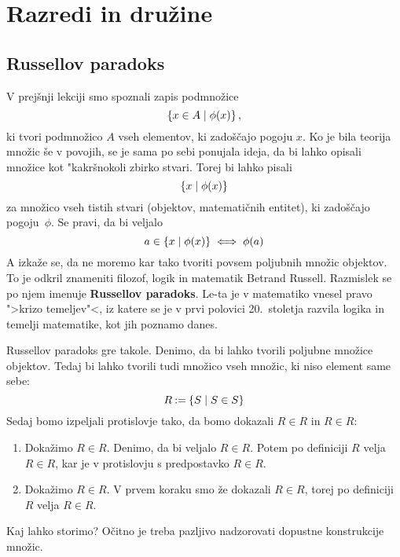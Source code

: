 \chapter{Razredi in družine}

\section{Russellov paradoks}

V prejšnji lekciji smo spoznali zapis podmnožice
%
\begin{equation*}
    \left\{ x \in A \; \middle| \; \phi(x) \right\},
\end{equation*}
%
ki tvori podmnožico $A$ vseh elementov, ki zadoščajo pogoju $x$. Ko je bila
teorija množic še v povojih, se je sama po sebi ponujala ideja, da bi lahko
opisali množice kot "kakršnokoli zbirko stvari. Torej bi lahko pisali
%
\begin{equation*}
    \left\{ x \; \middle| \; \phi(x) \right\}
\end{equation*}
%
za množico vseh tistih stvari (objektov, matematičnih entitet), ki zadoščajo
pogoju~$\phi$. Se pravi, da bi veljalo
%
\begin{equation*}
    a \in \left\{ x \; \middle| \; \phi(x) \right\} \iff \phi(a)
\end{equation*}
%
A izkaže se, da ne moremo kar tako tvoriti povsem poljubnih množic objektov. To
je odkril znameniti filozof, logik in matematik Betrand Russell. Razmislek se po
njem imenuje \textbf{Russellov paradoks}. Le-ta je v matematiko vnesel pravo ">krizo
temeljev"<, iz katere se je v prvi polovici 20.~stoletja razvila logika in
temelji matematike, kot jih poznamo danes.

Russellov paradoks gre takole. Denimo, da bi lahko tvorili poljubne množice
objektov. Tedaj bi lahko tvorili tudi množico vseh množic, ki niso element same
sebe:
%
\begin{equation*}
    R \mathbin{{:}{=}} \left\{ S \; \middle| \; S \in S \right\}
\end{equation*}
%
Sedaj bomo izpeljali protislovje tako, da bomo dokazali $R \in R$ in $R \in R$:
%
\begin{enumerate}
\item Dokažimo $R \in R$.
  Denimo, da bi veljalo $R \in R$. Potem po definiciji $R$ velja $R \in R$, kar
  je v protislovju s predpostavko $R \in R$.

\item
  Dokažimo $R \in R$. V prvem koraku smo že dokazali $R \in R$, torej po
  definiciji $R$ velja $R \in R$.
\end{enumerate}
%
Kaj lahko storimo? Očitno je treba pazljivo nadzorovati dopustne konstrukcije
množic.

